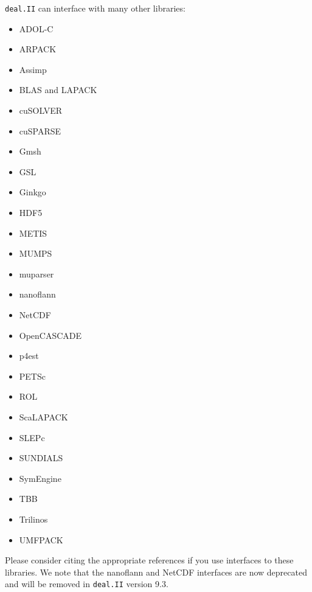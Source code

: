 \documentclass{ansarticle-preprint}
\newcommand{\specialword}[1]{\texttt{#1}}
\newcommand{\dealii}{{\specialword{deal.II}}\xspace}
\begin{document}
\dealii{} can interface with many other libraries:
\begin{multicols}{3}
  \begin{itemize}
    \item ADOL-C \cite{Griewank1996a,adol-c}
    \item ARPACK \cite{arpack}
    \item Assimp \cite{assimp}
    \item BLAS and LAPACK \cite{lapack}
    \item cuSOLVER \cite{cusolver}
    \item cuSPARSE \cite{cusparse}
    \item Gmsh \cite{geuzaine2009gmsh}
    \item GSL \cite{gsl2016}
    \item Ginkgo \cite{ginkgo-web-page}
    \item HDF5 \cite{hdf5}
    \item METIS \cite{karypis1998fast}
    \item MUMPS \cite{ADE00,MUMPS:1,MUMPS:2,mumps-web-page}
    \item muparser \cite{muparser-web-page}
    \item nanoflann \cite{nanoflann}%
    \item NetCDF \cite{rew1990netcdf}
    \item OpenCASCADE \cite{opencascade-web-page}
    \item p4est \cite{p4est}
    \item PETSc \cite{petsc-user-ref,petsc-web-page}
    \item ROL \cite{ridzal2014rapid}
    \item ScaLAPACK \cite{slug}
    \item SLEPc \cite{Hernandez:2005:SSF}
    \item SUNDIALS \cite{sundials}
    \item SymEngine \cite{symengine-web-page}
    \item TBB \cite{Rei07}
    \item Trilinos \cite{trilinos,trilinos-web-page}
    \item UMFPACK \cite{umfpack}
  \end{itemize}
\end{multicols}
Please consider citing the appropriate references if you use
interfaces to these libraries. We note that the nanoflann and NetCDF
interfaces are now deprecated and will be removed in \dealii{} version
9.3.
\end{document}
